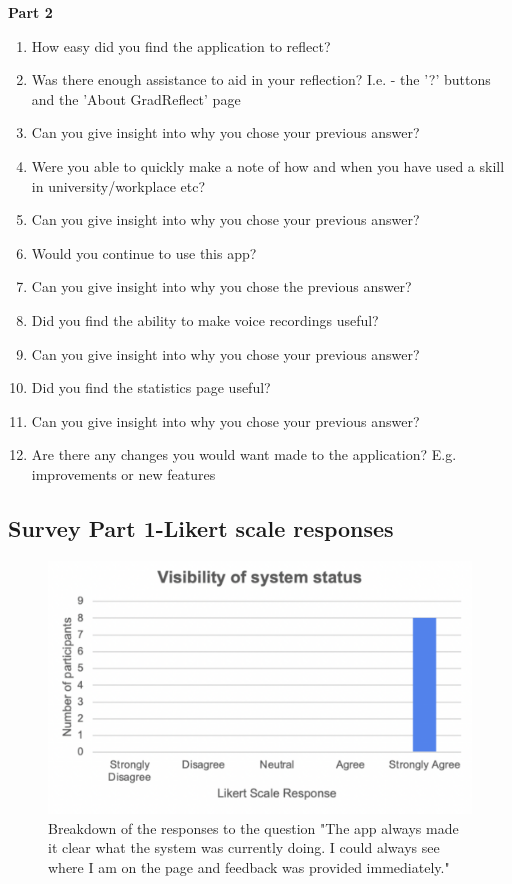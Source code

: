 \documentclass{l4proj}
\begin{document}
\begin{appendices}
\textbf{Part 2}

\begin{enumerate}
    \item How easy did you find the application to reflect?
    \item Was there enough assistance to aid in your reflection? I.e. - the '?' buttons and the 'About GradReflect' page
    \item Can you give insight into why you chose your previous answer?
    \item Were you able to quickly make a note of how and when you have used a skill in university/workplace etc?
    \item Can you give insight into why you chose your previous answer?
    \item Would you continue to use this app?
    \item Can you give insight into why you chose the previous answer?
    \item Did you find the ability to make voice recordings useful?
    \item Can you give insight into why you chose your previous answer?
    \item Did you find the statistics page useful?
    \item Can you give insight into why you chose your previous answer?
    \item Are there any changes you would want made to the application? E.g. improvements or new features
\end{enumerate}


\subsection{Survey Part 1-Likert scale responses} \label{Appendix-surveyP1-individualHeuristicGraphs}

\begin{figure}[H]
    \begin{centering}
    \includegraphics[scale=0.5]{images/heuristic1.pdf}
    \caption{Breakdown of the responses to the question "The app always made it clear what the system was currently doing. I could always see where I am on the page and feedback was provided immediately."}
    \label{fig: heuristic1}
    \end{centering}
\end{figure}


\end{appendices}
\end{document}
